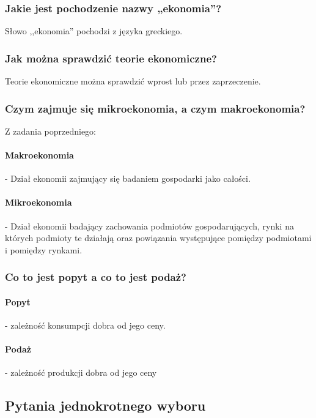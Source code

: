 \documentclass[a4paper,12pt]{article}
\begin{document}
\subsubsection{Jakie jest pochodzenie nazwy „ekonomia”?}

Słowo ,,ekonomia'' pochodzi z języka greckiego.

\subsubsection{Jak można sprawdzić teorie ekonomiczne?}

Teorie ekonomiczne można sprawdzić wprost lub przez zaprzeczenie.

\subsubsection{Czym zajmuje się mikroekonomia, a czym makroekonomia?}

Z zadania poprzedniego:

\paragraph*{Makroekonomia}

- Dział ekonomii zajmujący się badaniem gospodarki jako całości.

\paragraph*{Mikroekonomia}

- Dział ekonomii badający zachowania podmiotów gospodarujących, rynki na których podmioty te działają oraz powiązania występujące pomiędzy podmiotami i pomiędzy rynkami.

\subsubsection{Co to jest popyt a co to jest podaż?}

\paragraph*{Popyt} - zależność konsumpcji dobra od jego ceny.

\paragraph*{Podaż} - zależność produkcji dobra od jego ceny

\subsection{Pytania jednokrotnego wyboru}
\end{document}
